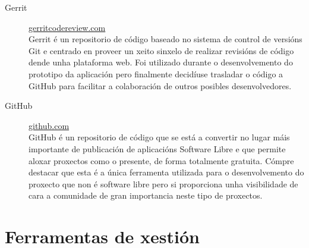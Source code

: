   \begin{description}
   \item [Gerrit] 
\href{https://www.gerritcodereview.com/}{gerritcodereview.com}\\ Gerrit é 
un repositorio de código baseado no sistema de control de 
versións Git e centrado en proveer un xeito sinxelo de realizar revisións de 
código dende unha plataforma web. Foi utilizado durante o desenvolvemento do 
prototipo da aplicación pero finalmente decidíuse trasladar o código a GitHub 
para facilitar a colaboración de outros posibles desenvolvedores.
   \item [GitHub] \href{http://github.com/}{github.com}\\ GitHub é un 
repositorio de 
código que se está a convertir no lugar máis 
importante de publicación de aplicacións Software Libre e que permite aloxar proxectos 
como o presente, de forma totalmente gratuita.
  Cómpre destacar que esta é a única ferramenta utilizada para o desenvolvemento do 
proxecto que non é software libre pero si proporciona unha visibilidade de cara a 
comunidade de gran importancia neste tipo de proxectos.
  \end{description}

  \section{Ferramentas de xestión}

